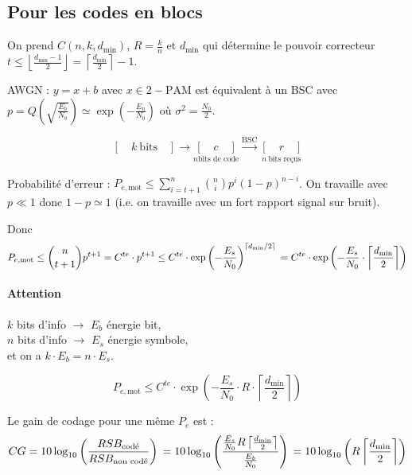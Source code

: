\subsection{Pour les codes en blocs}

	On prend $C(n,k,d_{\min})$, $R = \frac{k}{n}$ et $d_{\min}$ qui détermine le pouvoir correcteur $t \leq \left\lfloor \frac{d_{\min} - 1}{2} \right\rfloor = \left\lceil \frac{d_{\min}}{2} \right\rceil - 1$.

	AWGN : $y = x + b$ avec $x \in 2-\text{PAM}$ est équivalent à un BSC avec $p = Q \left( \sqrt{\frac{E_b}{N_0}} \right) \simeq  \exp \left( - \frac{E_n}{N_0} \right)$ où $\sigma^2 = \frac{N_0}{2}$.
	
	$$[ \quad k\ \text{bits} \quad ] \longrightarrow \underset{n \text{bits de code}}{[ \quad c \quad ]} \overset{\text{BSC}}{\longrightarrow} \underset{n\ \text{bits reçus}}{[ \quad r \quad ]}$$
	
	Probabilité d'erreur : $P_{e,\text{mot}} \leq \sum_{i = t + 1}^{n} \binom{n}{i} p^i (1 - p)^{n - i}$.
	On travaille avec $p \ll 1$ donc $1 - p \simeq 1$ (i.e. on travaille avec un fort rapport signal sur bruit).
	
	Donc
	$$
	P_{e,\text{mot}}
	\leq \binom{n}{t + 1} p^{t + 1}\\
	= C^{te} \cdot p^{t + 1}\\
	\leq C^{te} \cdot \exp \left( - \frac{E_s}{N_0} \right)^{\lceil d_{\min}/2 \rceil}\\
	= C^{te} \cdot \exp \left( - \frac{E_s}{N_0} \cdot \left\lceil \frac{d_{\min}}{2} \right\rceil \right)
	$$

	\paragraph{Attention}
		$k$ bits d'info $\longrightarrow$ $E_b$ énergie bit,\\
		$n$ bits d'info $\longrightarrow$ $E_s$ énergie symbole,\\
		et on a $k \cdot E_b = n \cdot E_s$.

	$$P_{e,\text{mot}} \leq C^{te} \cdot \exp \left( - \frac{E_s}{N_0} \cdot R \cdot \left\lceil \frac{d_{\min}}{2} \right\rceil \right)$$

	Le gain de codage pour une même $P_e$ est :
	$$
	CG
	= 10 \log_{10} \left( \frac{RSB_{\text{codé}}}{RSB_{\text{non codé}}} \right) \\
	= 10 \log_{10} \left( \frac{\frac{E_s}{N_0} R \left\lceil \frac{d_{\min}}{2} \right\rceil}{\frac{E_b}{N_0}} \right) \\
	= 10 \log_{10} \left( R \left\lceil \frac{d_{\min}}{2} \right\rceil \right)
	$$

